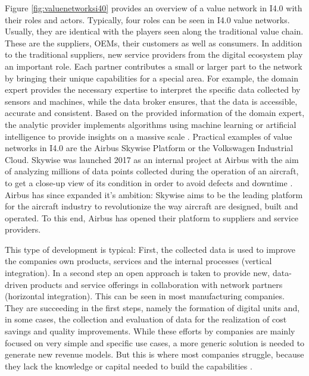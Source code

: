 Figure \ref{fig:valuenetworksi40} provides an overview of a value network in \ac{I4.0} with their roles and actors. Typically, four roles can be seen in \ac{I4.0} value networks. Usually, they are identical with the players seen along the traditional value chain. These are the suppliers, OEMs, their customers as well as consumers. In addition to the traditional suppliers, new service providers from the digital ecosystem play an important role. Each partner contributes a small or larger part to the network by bringing their unique capabilities for a special area. For example, the domain expert provides the necessary expertise to interpret the specific data collected by sensors and machines, while the data broker ensures, that the data is accessible, accurate and consistent. Based on the provided information of the domain expert, the analytic provider implements algorithms using machine learning or artificial intelligence to provide insights on a massive scale \cite[]{Russo2018HowCompetition}. Practical examples of value networks in \ac{I4.0} are the Airbus Skywise Platform or the Volkswagen Industrial Cloud. Skywise was launched 2017 as an internal project at Airbus with the aim of analyzing millions of data points collected during the operation of an aircraft, to get a close-up view of its condition in order to avoid defects and downtime \cite[]{Hanke2019AirbusWerden}. Airbus has since expanded it's ambition: Skywise aims to be the leading platform for the aircraft industry to revolutionize the way aircraft are designed, built and operated. To this end, Airbus has opened their platform to suppliers and service providers. 

This type of development is typical: First, the collected data is used to improve the companies own products, services and the internal processes (vertical integration). In a second step an open approach is taken to provide new, data-driven products and service offerings in collaboration with network partners (horizontal integration). This can be seen in most manufacturing companies. They are succeeding in the first steps, namely the formation of digital units and, in some cases, the collection and evaluation of data for the realization of cost savings and quality improvements. While these efforts by companies are mainly focused on very simple and specific use cases, a more generic solution is needed to generate new revenue models. But this is where most companies struggle, because they lack the knowledge or capital needed to build the capabilities \cite[p. 19]{Arnold2018DigitaleMittelstand}.

